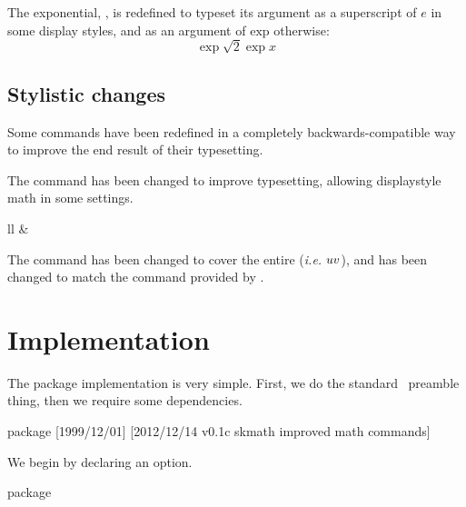 \documentclass[commonsets,load]{skdoc}
\providecommand\bar\relax \providecommand\d\relax
\begin{document}
  \DescribeMacro{}
  The exponential, \Macro\exp, is redefined to typeset its argument as a
  superscript of \(e\) in some display styles, and as an argument of
  \(\mathrm{exp}\) otherwise:
  \begin{equation*}
    \exp{\sqrt{2}\exp{x}}
  \end{equation*}

  \subsection{Stylistic changes}
  Some commands have been redefined in a completely backwards-compatible
  way to improve the end result of their typesetting.
 
  \DescribeMacro{}
  The \Macro\frac command has been changed to improve typesetting,
  allowing displaystyle math in some settings.
 
  \begin{DescribeMacrosTab}{ll}
    \Macro\bar{<expression>} &
    \Macro{}
  \end{DescribeMacrosTab}
  The \Macro\bar command has been changed to cover the entire 
   (\emph{i.e.} \(\bar{uv}\)), and \Macro\vec has
  been changed to match the  command provided by 
  .

  \section{Implementation}
  The package implementation is very simple. First, we do the standard
  \LaTeXe\ preamble thing, then we require some dependencies.
\begin{MacroCode}{package}
[1999/12/01]
%
    [2012/12/14 v0.1c skmath improved math commands]
\RequirePackage{xparse}
\RequirePackage[intlimits]{amsmath}
\RequirePackage{kvoptions,amssymb,mathtools,xfrac,isomath}
\end{MacroCode}

  We begin by declaring an option.
\begin{MacroCode}{package}
\ProcessKeyvalOptions*
\end{MacroCode}
\end{document}
